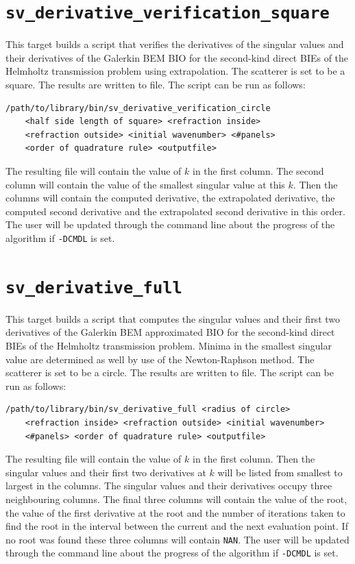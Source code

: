 \documentclass[a4paper, oneside]{discothesis}
\begin{document}
\cprotect\section{\verb|sv_derivative_verification_square|}
This target builds a script that verifies the derivatives of the singular
values and their derivatives of the Galerkin BEM BIO for the
second-kind direct BIEs of the Helmholtz transmission problem
using extrapolation.
The scatterer is set to be a square.
The results are written to file.
The script can be run as follows:
\begin{verbatim}
/path/to/library/bin/sv_derivative_verification_circle 
	<half side length of square> <refraction inside> 
	<refraction outside> <initial wavenumber> <#panels> 
	<order of quadrature rule> <outputfile>
\end{verbatim}
The resulting file will contain the value of $k$ in the first column.
The second column will contain the value of the smallest singular value at this $k$.
Then the columns will contain the computed derivative, the extrapolated derivative, the computed second derivative and the extrapolated second derivative in this order.
The user will be updated through the command line about the progress of the algorithm if \verb|-DCMDL| is set.

\cprotect\section{\verb|sv_derivative_full|}
This target builds a script that computes the singular values and
their first two derivatives of the Galerkin BEM
approximated BIO for the second-kind direct BIEs of the Helmholtz
transmission problem.
Minima in the smallest singular value are determined as well
by use of the Newton-Raphson method.
The scatterer is set to be a circle.
The results are written to file.
The script can be run as follows:
\begin{verbatim}
/path/to/library/bin/sv_derivative_full <radius of circle> 
	<refraction inside> <refraction outside> <initial wavenumber>
	<#panels> <order of quadrature rule> <outputfile>
\end{verbatim}
The resulting file will contain the value of $k$ in the first column.
Then the singular values and their first two derivatives at $k$ will be listed from smallest to largest in the columns.
The singular values and their derivatives occupy three neighbouring columns.
The final three columns will contain the value of the root, the value of the first derivative at the root and the number of iterations taken to find the root in the interval between the current and the next evaluation point.
If no root was found these three columns will contain \verb|NAN|.
The user will be updated through the command line about the progress of the algorithm if \verb|-DCMDL| is set.
\end{document}
